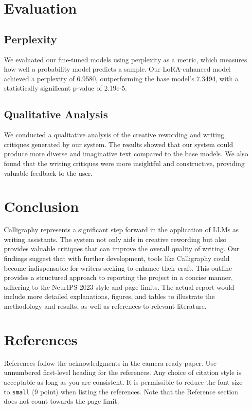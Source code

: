 \documentclass{article}
\begin{document}
\section{Evaluation}
\label{eval}

\subsection{Perplexity}

We evaluated our fine-tuned models using perplexity as a metric, which measures how well a probability model predicts a sample. Our LoRA-enhanced model achieved a perplexity of 6.9580, outperforming the base model's 7.3494, with a statistically significant p-value of 2.19e-5.
\subsection{Qualitative Analysis}

We conducted a qualitative analysis of the creative rewording and writing critiques generated by our system. The results showed that our system could produce more diverse and imaginative text compared to the base models. We also found that the writing critiques were more insightful and constructive, providing valuable feedback to the user.


\section{Conclusion}
\label{conclusion}


Calligraphy represents a significant step forward in the application of LLMs as writing assistants. The system not only aids in creative rewording but also provides valuable critiques that can improve the overall quality of writing. Our findings suggest that with further development, tools like Calligraphy could become indispensable for writers seeking to enhance their craft. This outline provides a structured approach to reporting the project in a concise manner, adhering to the NeurIPS 2023 style and page limits. The actual report would include more detailed explanations, figures, and tables to illustrate the methodology and results, as well as references to relevant literature.


\section*{References}


References follow the acknowledgments in the camera-ready paper. Use unnumbered first-level heading for
the references. Any choice of citation style is acceptable as long as you are
consistent. It is permissible to reduce the font size to \verb+small+ (9 point)
when listing the references.
Note that the Reference section does not count towards the page limit.
\medskip
\end{document}
